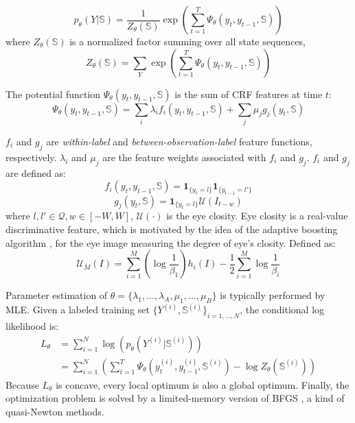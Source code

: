 \documentclass[journal]{IEEEtran}
\begin{document}
\begin{equation}
\label{eq_D_1}
p_\theta(Y|\mathbb{S}) = \frac{1}{Z_\theta(\mathbb{S})} \exp (\sum_{t=1}^T \Psi_\theta(y_t,y_{t-1},\mathbb{S}))
\end{equation}
where $Z_\theta(\mathbb{S})$ is a normalized factor summing over all state sequences,
\begin{equation}
\label{eq_D_2}
Z_\theta(\mathbb{S}) = \sum_Y \exp (\sum_{t=1}^T \Psi_\theta(y_t,y_{t-1},\mathbb{S}))
\end{equation}

The potential function $\Psi_\theta(y_t,y_{t-1},\mathbb{S})$ is the sum of CRF features at time $t$:
\begin{equation}
\label{eq_D_3}
\Psi_\theta(y_t,y_{t-1},\mathbb{S}) = \sum_i \lambda_i f_i(y_t,y_{t-1},\mathbb{S}) + \sum_j \mu_j g_j(y_t,\mathbb{S})
\end{equation}

$f_i$ and $g_j$ are \textit{within-label} and \textit{between-observation-label} feature functions, respectively. $\lambda_i$ and $\mu_j$ are the feature weights associated with $f_i$ and $g_j$. $f_i$ and $g_j$ are defined as:
\begin{equation}
\label{eq_D_4}
f_i(y_t,y_{t-1},\mathbb{S}) = \mathbf{1}_{\{y_t=l\}} \mathbf{1}_{\{y_{t-1}=l'\}}
\end{equation}
\begin{equation}
\label{eq_D_5}
g_j(y_t,\mathbb{S}) = \mathbf{1}_{\{y_t=l\}} \mathcal{U}(I_{t-w})
\end{equation}
where $l, l' \in \mathcal{Q}, w\in[-W,W]$, $\mathcal{U}(\cdot)$ is the eye closity. Eye closity is a real-value discriminative feature, which is motivated by the idea of the adaptive boosting algorithm \cite{freund1997decision}, for the eye image measuring the degree of eye's closity. Defined as:
\begin{equation}
\label{eq_D_6}
\mathcal{U}_M(I) = \sum_{i=1}^M (\log \frac{1}{\beta_1}) h_i(I) - \frac{1}{2} \sum_{i=1}^M \log \frac{1}{\beta_i}
\end{equation}

Parameter estimation of $\theta=\{\lambda_1,\dots,\lambda_A,\mu_1,\dots,\mu_B\}$ is typically performed by MLE. Given a labeled training set $\{Y^{(i)}, \mathbb{S}^{(i)}\}_{i=1,\dots,N}$, the conditional log likelihood is:
\begin{equation}
\label{eq_D_7}
\begin{aligned}
L_\theta &= \sum_{i=1}^N \log (p_\theta(Y^{(i)}|\mathbb{S}^{(i)})) \\
&= \sum_{i=1}^N (\sum_{t=1}^T \Psi_\theta(y_t^{(i)},y_{t-1}^{(i)},\mathbb{S}^{(i)}) - \log Z_\theta(\mathbb{S}^{(i)}))
\end{aligned}
\end{equation}
Because $L_\theta$ is concave, every local optimum is also a global optimum. Finally, the optimization problem is solved by a limited-memory version of BFGS \cite{sha2003shallow}, a kind of quasi-Newton methods.
\end{document}
